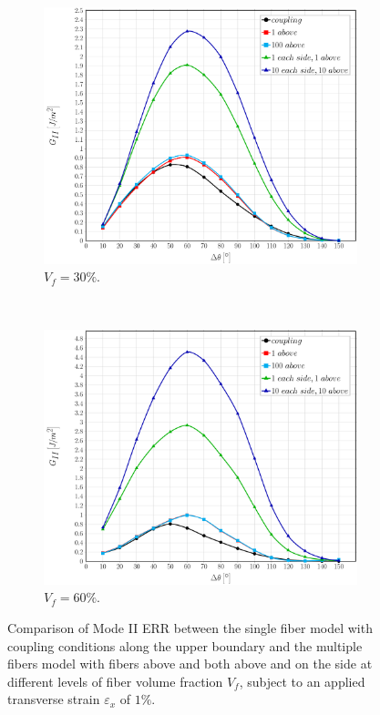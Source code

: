\documentclass[review]{elsarticle}
\begin{document}
\begin{figure}[!h]
\centering
    \begin{subfigure}[b]{0.475\textwidth}
        \includegraphics[width=\textwidth]{comparecouplingabovesidefibers-vf30-GII.pdf}
        \caption{$V_{f}=30\%$.}\label{subfig:comparisoncoupling30MII}
    \end{subfigure} ~
    \begin{subfigure}[b]{0.475\textwidth}
        \includegraphics[width=\textwidth]{comparecouplingabovesidefibers-vf60-GII.pdf}
        \caption{$V_{f}=60\%$.}\label{subfig:comparisoncoupling60MII}
    \end{subfigure}

\caption{Comparison of Mode II ERR between the single fiber model with coupling conditions along the upper boundary and the multiple fibers model with fibers above and both above and on the side at different levels of fiber volume fraction $V_{f}$, subject to an applied transverse strain $\varepsilon_{x}$ of $1\%$.}\label{fig:comparisoncouplingMII}
\end{figure}
\end{document}
